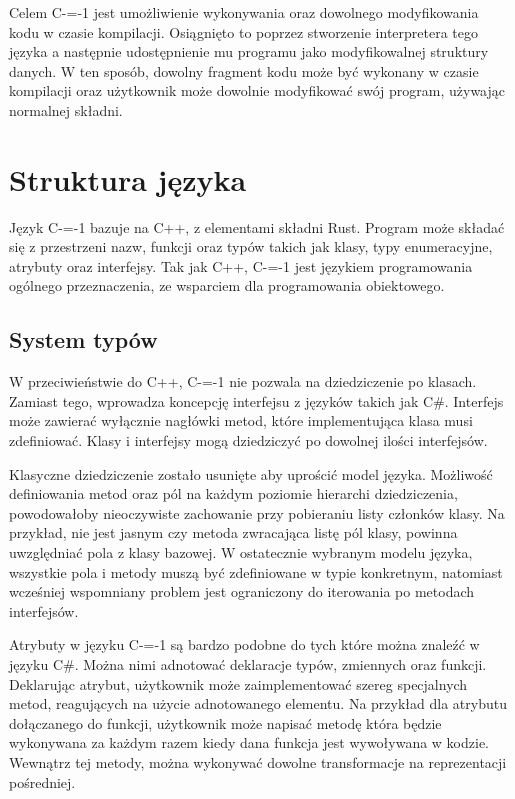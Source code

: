 \documentclass[conference]{IEEEtran}
\begin{document}
Celem C-=-1 jest umożliwienie wykonywania oraz dowolnego modyfikowania kodu w czasie kompilacji.
Osiągnięto to poprzez stworzenie interpretera tego języka a następnie udostępnienie mu programu jako modyfikowalnej struktury danych.
W ten sposób, dowolny fragment kodu może być wykonany w czasie kompilacji oraz użytkownik może dowolnie modyfikować swój program, używając normalnej składni.

\section{Struktura języka}

Język C-=-1 bazuje na C++, z elementami składni Rust.
Program może składać się z przestrzeni nazw, funkcji oraz typów takich jak klasy, typy enumeracyjne, atrybuty oraz interfejsy.
Tak jak C++, C-=-1 jest językiem programowania ogólnego przeznaczenia, ze wsparciem dla programowania obiektowego.

\subsection{System typów}

W przeciwieństwie do C++, C-=-1 nie pozwala na dziedziczenie po klasach.
Zamiast tego, wprowadza koncepcję interfejsu z języków takich jak C\#.
Interfejs może zawierać wyłącznie nagłówki metod, które implementująca klasa musi zdefiniować.
Klasy i interfejsy mogą dziedziczyć po dowolnej ilości interfejsów.

Klasyczne dziedziczenie zostało usunięte aby uprościć model języka.
Możliwość definiowania metod oraz pól na każdym poziomie hierarchi dziedziczenia, powodowałoby nieoczywiste zachowanie przy pobieraniu listy członków klasy.
Na przykład, nie jest jasnym czy metoda zwracająca listę pól klasy, powinna uwzględniać pola z klasy bazowej.
W ostatecznie wybranym modelu języka, wszystkie pola i metody muszą być zdefiniowane w typie konkretnym, natomiast wcześniej wspomniany problem jest ograniczony do iterowania po metodach interfejsów.

Atrybuty w języku C-=-1 są bardzo podobne do tych które  można znaleźć w języku C\#.
Można nimi adnotować deklaracje typów, zmiennych oraz funkcji.
Deklarując atrybut, użytkownik może zaimplementować szereg specjalnych metod, reagujących na użycie adnotowanego elementu.
Na przykład dla atrybutu dołączanego do funkcji, użytkownik może napisać metodę która będzie wykonywana za każdym razem kiedy dana funkcja jest wywoływana w kodzie.
Wewnątrz tej metody, można wykonywać dowolne transformacje na reprezentacji pośredniej.
\end{document}
